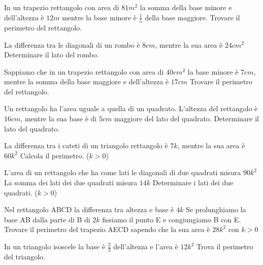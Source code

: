 \begin{multicols}{2}
\begin{esercizio}[\Ast]
 \label{ese:6.64}
In un trapezio rettangolo con area di \(81\unit{m^2}\) la somma della base minore e dell'altezza è \(12\unit{m}\) mentre la base minore è \(\frac 1 5\) della base maggiore. Trovare il perimetro del rettangolo.
\end{esercizio}

\begin{esercizio}[\Ast]
 \label{ese:6.65}
La differenza tra le diagonali di un rombo è \(8\unit{cm}\), mentre la sua area è \(24\unit{{cm}^2}\) Determinare il lato del rombo.
\end{esercizio}

\begin{esercizio}[\Ast]
 \label{ese:6.66}
Sappiamo che in un trapezio rettangolo con area di \(40\unit{{cm}^2}\) la base minore è \(7\unit{cm}\), mentre la somma della base maggiore e dell'altezza è \(17\unit{cm}\) Trovare il perimetro del rettangolo.
\end{esercizio}

\begin{esercizio}[\Ast]
 \label{ese:6.67}
Un rettangolo ha l'area uguale a quella di un quadrato. L'altezza del rettangolo è \(16\unit{cm}\), mentre la sua base è di \(5\unit{cm}\) maggiore del lato del quadrato. Determinare il lato del quadrato.
\end{esercizio}

\begin{esercizio}[\Ast]
 \label{ese:6.68}
La differenza tra i cateti di un triangolo rettangolo è \(7k\), mentre la sua area è \(60 k^2\) Calcola il perimetro. (\(k>0\))
\end{esercizio}

\begin{esercizio}[\Ast]
 \label{ese:6.69}
L'area di un rettangolo che ha come lati le diagonali di due quadrati misura \(90 k^2\) La somma dei lati dei due quadrati misura \(14k\) Determinare i lati dei due quadrati. (\( k>0 \))
\end{esercizio}

\begin{esercizio}[\Ast]
 \label{ese:6.70}
Nel rettangolo ABCD la differenza tra altezza e base è \(4k\) Se prolunghiamo la base AB dalla parte di B di \(2k\) fissiamo il punto E e congiungiamo B con E. Trovare il perimetro del trapezio AECD sapendo che la sua area è \(28k^2\) con \(k>0\)
\end{esercizio}

\begin{esercizio}[\Ast]
 \label{ese:6.71}
In un triangolo isoscele la base è \( \frac 2 3 \) dell'altezza e l'area è \(12k^2\) Trova il perimetro del triangolo.
\end{esercizio}
\end{multicols}

